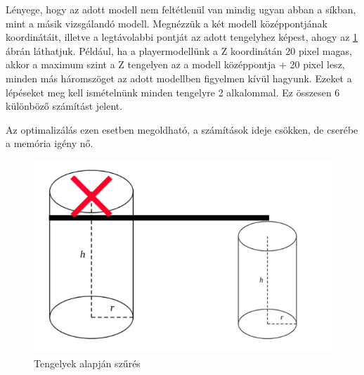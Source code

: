 \newpage
{}
Lényege, hogy az adott modell nem feltétlenül van mindig ugyan abban a síkban, mint a másik vizsgálandó modell. Megnézzük a két modell középpontjának koordinátáit, illetve a legtávolabbi pontját az adott tengelyhez képest, ahogy az \ref{fig:opt_3} ábrán láthatjuk. Például, ha a playermodellünk a Z koordinátán 20 pixel magas, akkor a maximum szint a Z tengelyen az a modell középpontja + 20 pixel lesz, minden más háromszöget az adott modellben figyelmen kívül hagyunk. Ezeket a lépéseket meg kell ismételnünk minden tengelyre 2 alkalommal. Ez összesen 6 különböző számítást jelent.

Az optimalizálás ezen esetben megoldható, a számítások ideje csökken, de cserébe a memória igény nő.
\begin{figure}[h]
	\centering
	\includegraphics[width=13truecm, height=7.5truecm]{images/opt_5.3.png}
	\caption{Tengelyek alapján szűrés}
	\label{fig:opt_3}
\end{figure}
